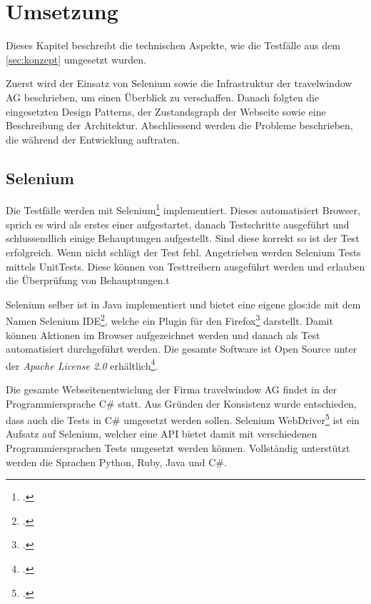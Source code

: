

\chapter{Umsetzung}
\label{sec:umsetzung}

Dieses Kapitel beschreibt die technischen Aspekte, wie die Testfälle aus dem \cref{sec:konzept}  umgesetzt wurden.

Zuerst wird der Einsatz von Selenium sowie die Infrastruktur der travelwindow AG beschrieben, um einen Überblick zu verschaffen. Danach folgten die eingesetzten Design Patterns, der Zustandsgraph der Webseite sowie eine Beschreibung der Architektur. Abschliessend werden die Probleme beschrieben, die während der Entwicklung auftraten.

\section{Selenium}
\label{sec:umsetzung:selenium}
Die Testfälle werden mit Selenium\footcite{Selenium_-_Web_Browser_Automation_2015-09-26} implementiert. Dieses automatisiert Browser, sprich es wird als erstes einer aufgestartet, danach Testschritte ausgeführt und schlussendlich einige Behauptungen aufgestellt. Sind diese korrekt so ist der Test erfolgreich. Wenn nicht schlägt der Test fehl. 
Angetrieben werden Selenium Tests mittels UnitTests. Diese können von Testtreibern ausgeführt werden und erlauben die Überprüfung von Behauptungen.t

Selenium selber ist in Java implementiert und bietet eine eigene \Gls{glos:ide} mit dem Namen Selenium IDE\footcite{Selenium_IDE_Plugins_2015-09-26}, welche ein Plugin für den Firefox\footcite{Download_Firefox__Free_Web_Browser__Mozilla_2015-09-26} darstellt. Damit können Aktionen im Browser aufgezeichnet werden und danach als Test automatisiert durchgeführt werden. Die gesamte Software ist Open Source unter der \textit{Apache License 2.0} erhältlich\footcite{Selenium_software_-_Wikipedia_the_free_encyclopedia_2015-09-26}.

Die gesamte Webseitenentwiclung der Firma travelwindow AG findet in der Programmiersprache C\# statt. Aus Gründen der Konsistenz wurde entschieden, dass auch die Tests in C\# umgesetzt werden sollen. 
Selenium WebDriver\footcite{Selenium_WebDriver_2015-09-26} ist ein Aufsatz auf Selenium, welcher eine API bietet damit mit verschiedenen Programmiersprachen Tests umgesetzt werden können. Vollständig unterstützt werden die Sprachen Python, Ruby, Java und C\#. 

